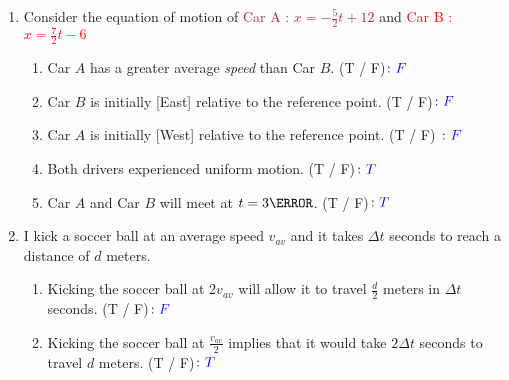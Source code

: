 \documentclass[12pt]{article} %
\begin{document}
\begin{qstn}[1]
\begin{enumerate}
		
		\item Consider the equation of motion of \textcolor{brown}{Car A :} \textcolor{brown}{$x = -\frac{5}{2}t  + 12$} and \textcolor{red}{Car B :} \textcolor{red}{$x = \frac{7}{2}t - 6$}
			\begin{enumerate}[label = (\alph*)]
				\item Car $A$ has a greater average \emph{speed} than Car $B$. (T / F)$\colon \textcolor{blue}{F}$
				\item Car $B$ is initially [East] relative to the reference point. (T / F)$\colon \textcolor{blue}{F}$
				\item Car $A$ is initially [West] relative to the reference point. (T / F) $\colon \textcolor{blue}{F}$
				\item Both drivers experienced uniform motion. (T / F)$\colon \textcolor{blue}{T}$
				\item Car $A$ and Car $B$ will meet at $t = 3\s$. (T / F)$\colon \textcolor{blue}{T}$
			\end{enumerate}
		

		\item I kick a soccer ball at an average speed $v_{av}$ and it takes $\Delta t$ seconds to reach a distance of $d$ meters.
			\begin{enumerate}[label = (\alph*)]
				\item Kicking the soccer ball at $2v_{av}$ will allow it to travel $\frac{d}{2}$ meters in $\Delta t$ seconds. (T / F)$\colon \textcolor{blue}{F}$
				\item Kicking the soccer ball at $\frac{v_{av}}{2}$ implies that it would take $2\Delta t$ seconds to travel $d$ meters. (T / F)$\colon \textcolor{blue}{T}$
			\end{enumerate}
	
	\end{enumerate}

\end{qstn}
	
\end{document}
